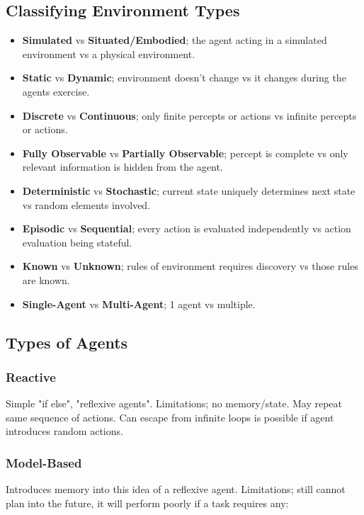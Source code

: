 \documentclass{article}
\begin{document}
\subsection{Classifying Environment Types}

\begin{itemize}
	\item \textbf{Simulated} vs \textbf{Situated/Embodied}; the agent acting in a simulated environment vs a physical environment.
	\item \textbf{Static} vs \textbf{Dynamic}; environment doesn't change vs it changes during the agents exercise.
	\item \textbf{Discrete} vs \textbf{Continuous}; only finite percepts or actions vs infinite percepts or actions.
	\item \textbf{Fully Observable} vs \textbf{Partially Observable}; percept is complete vs only relevant information is hidden from the agent.
	\item \textbf{Deterministic} vs \textbf{Stochastic}; current state uniquely determines next state vs random elements involved.
	\item \textbf{Episodic} vs \textbf{Sequential}; every action is evaluated independently vs action evaluation being stateful.
	\item \textbf{Known} vs \textbf{Unknown}; rules of environment requires discovery vs those rules are known.
	\item \textbf{Single-Agent} vs \textbf{Multi-Agent}; 1 agent vs multiple.
\end{itemize}

\subsection{Types of Agents}

\subsubsection{Reactive}
Simple "if else", "reflexive agents". Limitations; no memory/state. May repeat same sequence of actions. Can escape from infinite loops is possible if agent introduces random actions.

\subsubsection{Model-Based}
Introduces memory into this idea of a reflexive agent. Limitations; still cannot plan into the future, it will perform poorly if a task requires any:
\end{document}
